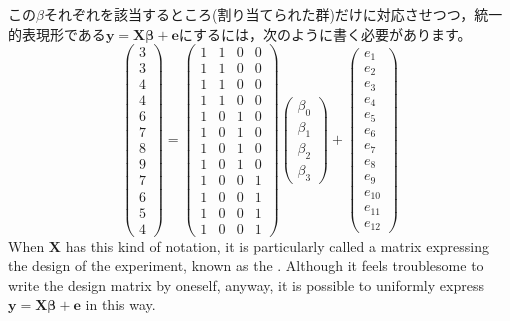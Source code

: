 \documentclass{ltjsbook}
\begin{document}
この$\beta$それぞれを該当するところ(割り当てられた群)だけに対応させつつ，統一的表現形である$\bm{y}=\bm{X\beta}+\bm{e}$にするには，次のように書く必要があります。
\[
	\begin{pmatrix}
		3 \\
		3 \\
		4 \\
		4 \\
		6 \\
		7 \\
		8 \\
		9 \\
		7 \\
		6 \\
		5 \\
		4
	\end{pmatrix}
	=
	\begin{pmatrix}
		1 & 1 & 0 & 0 \\
		1 & 1 & 0 & 0 \\
		1 & 1 & 0 & 0 \\
		1 & 1 & 0 & 0 \\
		1 & 0 & 1 & 0 \\
		1 & 0 & 1 & 0 \\
		1 & 0 & 1 & 0 \\
		1 & 0 & 1 & 0 \\
		1 & 0 & 0 & 1 \\
		1 & 0 & 0 & 1 \\
		1 & 0 & 0 & 1 \\
		1 & 0 & 0 & 1
	\end{pmatrix}
	\begin{pmatrix}
		\beta_0 \\
		\beta_1 \\
		\beta_2 \\
		\beta_3
	\end{pmatrix}+
	\begin{pmatrix}
		e_1    \\
		e_2    \\
		e_3    \\
		e_4    \\
		e_5    \\
		e_6    \\
		e_7    \\
		e_8    \\
		e_9    \\
		e_{10} \\
		e_{11} \\
		e_{12}
	\end{pmatrix}
\]
When $\bm{X}$ has this kind of notation, it is particularly called a matrix expressing the design of the experiment, known as the . Although it feels troublesome to write the design matrix by oneself, anyway, it is possible to uniformly express $\bm{y}=\bm{X\beta}+\bm{e}$ in this way.
\end{document}
